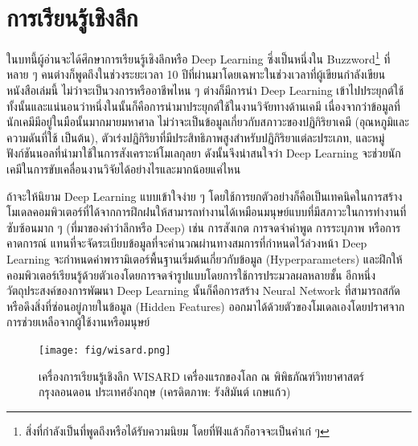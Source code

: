 

\chapter{การเรียนรู้เชิงลึก}
\label{ch:deep_learning}

ในบทนี้ผู้อ่านจะได้ศึกษาการเรียนรู้เชิงลึกหรือ Deep Learning ซึ่งเป็นหนึ่งใน Buzzword\footnote{สิ่งที่กำลังเป็นที่พูดถึงหรือได้รับความนิยม โดยที่ฟังแล้วก็อาจจะเป็นคำเก๋ ๆ} ที่หลาย ๆ คนต่างก็พูดถึงในช่วงระยะเวลา 10 ปีที่ผ่านมาโดยเฉพาะในช่วงเวลาที่ผู้เขียนกำลังเขียนหนังสือเล่มนี้ ไม่ว่าจะเป็นวงการหรืออาชีพไหน ๆ ต่างก็มีการนำ Deep Learning เข้าไปประยุกต์ใช้ทั้งนั้นและแน่นอนว่าหนึ่งในนั้นก็คือการนำมาประยุกต์ใช้ในงานวิจัยทางด้านเคมี เนื่องจากว่าข้อมูลที่นักเคมีมีอยู่ในมือนั้นมากมายมหาศาล ไม่ว่าจะเป็นข้อมูลเกี่ยวกับสภาวะของปฏิกิริยาเคมี (อุณหภูมิและความดันที่ใช้ เป็นต้น), ตัวเร่งปฏิกิริยาที่มีประสิทธิภาพสูงสำหรับปฏิกิริยาแต่ละประเภท, และหมู่ฟังก์ชันนอลที่นำมาใช้ในการสังเคราะห์โมเลกุลยา ดังนั้นจึงน่าสนใจว่า Deep Learning จะช่วยนักเคมีในการขับเคลื่อนงานวิจัยได้อย่างไรและมากน้อยแค่ไหน

ถ้าจะให้นิยาม Deep Learning แบบเข้าใจง่าย ๆ โดยใช้การยกตัวอย่างก็คือเป็นเทคนิคในการสร้างโมเดลคอมพิวเตอร์ที่ได้จากการฝึกฝนให้สามารถทำงานได้เหมือนมนุษย์แบบที่มีสภาวะในการทำงานที่ซับซ้อนมาก ๆ (ที่มาของคำว่าลึกหรือ Deep) เช่น การสังเกต การจดจำคำพูด การระบุภาพ หรือการคาดการณ์ แทนที่จะจัดระเบียบข้อมูลที่จะคำนวณผ่านทางสมการที่กำหนดไว้ล่วงหน้า Deep Learning จะกำหนดค่าพารามิเตอร์พื้นฐานเริ่มต้นเกี่ยวกับข้อมูล (Hyperparameters) และฝึกให้คอมพิวเตอร์เรียนรู้ด้วยตัวเองโดยการจดจำรูปแบบโดยการใช้การประมวลผลหลายชั้น อีกหนึ่งวัตถุประสงค์ของการพัฒนา Deep Learning นั้นก็คือการสร้าง Neural Network ที่สามารถสกัดหรือดึงสิ่งที่ซ่อนอยู่ภายในข้อมูล (Hidden Features) ออกมาได้ด้วยตัวของโมเดลเองโดยปราศจากการช่วยเหลือจากผู้ใช้งานหรือมนุษย์

\begin{figure}[H]
    \centering
    \texttt{[image: fig/wisard.png]}
    \caption{เครื่องการเรียนรู้เชิงลึก WISARD เครื่องแรกของโลก ณ พิพิธภัณฑ์วิทยาศาสตร์ กรุงลอนดอน ประเทศอังกฤษ (เครดิตภาพ: รังสิมันต์ เกษแก้ว)}
    \label{fig:wisard}
\end{figure}

